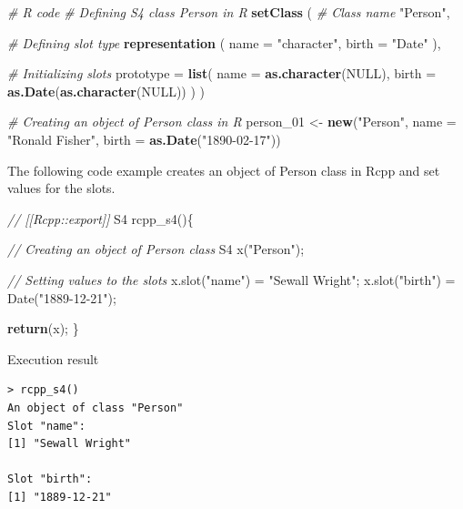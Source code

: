 \documentclass[]{book}
\newenvironment{Shaded}{\begin{snugshade}}{\end{snugshade}}
\newcommand{\CommentTok}[1]{\textcolor[rgb]{0.56,0.35,0.01}{\textit{#1}}}
\newcommand{\ControlFlowTok}[1]{\textcolor[rgb]{0.13,0.29,0.53}{\textbf{#1}}}
\newcommand{\DataTypeTok}[1]{\textcolor[rgb]{0.13,0.29,0.53}{#1}}
\newcommand{\DecValTok}[1]{\textcolor[rgb]{0.00,0.00,0.81}{#1}}
\newcommand{\KeywordTok}[1]{\textcolor[rgb]{0.13,0.29,0.53}{\textbf{#1}}}
\newcommand{\NormalTok}[1]{#1}
\newcommand{\OtherTok}[1]{\textcolor[rgb]{0.56,0.35,0.01}{#1}}
\newcommand{\StringTok}[1]{\textcolor[rgb]{0.31,0.60,0.02}{#1}}
\begin{document}
\begin{Shaded}
\begin{Highlighting}[]
\CommentTok{# R code}
\CommentTok{# Defining S4 class Person in R}
\KeywordTok{setClass}\NormalTok{ (}
  \CommentTok{# Class name}
  \StringTok{"Person"}\NormalTok{,}

  \CommentTok{# Defining slot type}
  \KeywordTok{representation}\NormalTok{ (}
    \DataTypeTok{name =} \StringTok{"character"}\NormalTok{,}
    \DataTypeTok{birth =} \StringTok{"Date"}
\NormalTok{  ),}

  \CommentTok{# Initializing slots}
  \DataTypeTok{prototype =} \KeywordTok{list}\NormalTok{(}
    \DataTypeTok{name =} \KeywordTok{as.character}\NormalTok{(}\OtherTok{NULL}\NormalTok{),}
    \DataTypeTok{birth =} \KeywordTok{as.Date}\NormalTok{(}\KeywordTok{as.character}\NormalTok{(}\OtherTok{NULL}\NormalTok{))}
\NormalTok{  )}
\NormalTok{)}

\CommentTok{# Creating an object of Person class in R}
\NormalTok{person_}\DecValTok{01}\NormalTok{ <-}\StringTok{ }\KeywordTok{new}\NormalTok{(}\StringTok{"Person"}\NormalTok{,}
                 \DataTypeTok{name =} \StringTok{"Ronald Fisher"}\NormalTok{,}
                 \DataTypeTok{birth =} \KeywordTok{as.Date}\NormalTok{(}\StringTok{"1890-02-17"}\NormalTok{))}
\end{Highlighting}
\end{Shaded}

The following code example creates an object of Person class in Rcpp and set values for the slots.

\begin{Shaded}
\begin{Highlighting}[]
\CommentTok{// [[Rcpp::export]]}
\NormalTok{S4 rcpp_s4()\{}

    \CommentTok{// Creating an object of Person class}
\NormalTok{    S4 x(}\StringTok{"Person"}\NormalTok{);}

    \CommentTok{// Setting values to the slots}
\NormalTok{    x.slot(}\StringTok{"name"}\NormalTok{)  = }\StringTok{"Sewall Wright"}\NormalTok{;}
\NormalTok{    x.slot(}\StringTok{"birth"}\NormalTok{) = Date(}\StringTok{"1889-12-21"}\NormalTok{);}

    \ControlFlowTok{return}\NormalTok{(x);}
\NormalTok{\}}
\end{Highlighting}
\end{Shaded}

Execution result

\begin{verbatim}
> rcpp_s4()
An object of class "Person"
Slot "name":
[1] "Sewall Wright"

Slot "birth":
[1] "1889-12-21"
\end{verbatim}
\end{document}

